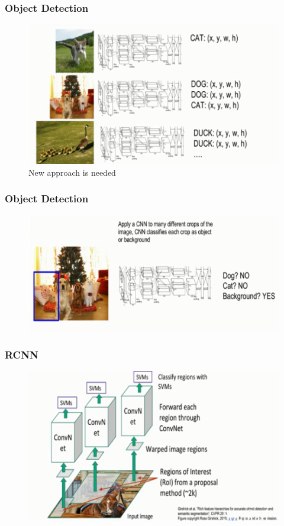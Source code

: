 \documentclass{beamer}
\begin{document}
\begin{frame}
	\frametitle{Object Detection}
	\begin{figure}
		\includegraphics[width=\linewidth]{Pics/objectdetect.PNG}
		\caption{{\color{red}New approach is needed}}
	\end{figure}
	
\end{frame}
\begin{frame}
	\frametitle{Object Detection}
	
	\begin{figure}
		\includegraphics[width=\linewidth]{Pics/objectdetect2.PNG}
		
	\end{figure}
	
\end{frame}
\begin{frame}
	\frametitle{RCNN}
	
	\begin{figure}
		\includegraphics[width=\linewidth]{Pics/rcnn.PNG}
		
	\end{figure}
	
\end{frame}
\end{document}

